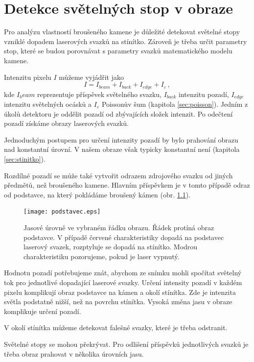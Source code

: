 \chapter{Detekce světelných stop v obraze}
\label{sec:detection}
Pro analýzu vlastností broušeného kamene je důležité detekovat světelné stopy vzniklé dopadem laserových svazků na stínítko. Zároveň je třeba určit parametry stop, které se budou porovnávat s parametry svazků matematického modelu kamene. 

Intenzitu pixelu $I$ můžeme vyjádřit jako 
\begin{equation}
	I = I_{beam}+I_{back}+I_{edge}+I_{\varepsilon}\,,
	\label{eq:intensitu_sum}
\end{equation}
 kde $I_beam$ reprezentuje příspěvek světelného svazku, $I_{back}$ intenzitu pozadí, $I_{edge}$ intenzitu světelných ocásků a $I_{\varepsilon}$ Poissonův šum (kapitola \ref{sec:poisson}). Jedním z úkolů detektoru je oddělit pozadí od zbývajících složek intenzit. Po odečtení pozadí získáme obrazy laserových svazků.   
 
Jednoduchým postupem pro určení intenzity pozadí by bylo prahování obrazu nad konstantní úrovní. V našem obraze však typicky konstantní není (kapitola \ref{sec:stinitko}). 

Rozdílné pozadí se může také vytvořit odrazem zdrojového svazku od jiných předmětů, než broušeného kamene. Hlavním příspěvkem je v tomto případě odraz od podstavce, na který pokládáme broušený kámen (obr. \ref{fig: podstavec}).

\begin{figure}[htps]
\centering
\texttt{[image: podstavec.eps]}
\caption{Jasové úrovně ve vybraném řádku obrazu. Řádek protíná obraz podstavce. V případě červené charakteristiky dopadá na podstavec laserový svazek, rozptyluje se dopadá na stínítko. Modrou charakteristiku pozorujeme, pokud je laser vypnutý.}
\label{fig: podstavec}
\end{figure}

Hodnotu pozadí potřebujeme znát, abychom ze snímku mohli spočítat světelný tok pro jednotlivé dopadající laserové svazky. Určení intensity pozadí v každém pixelu komplikují obraz podstavce na kámen a okolí stínítka. Zde je intenzita světla podstatně nižší, než na povrchu stínítka. Vysoká změna jasu v obraze komplikuje určení pozadí.  

V okolí stínítka můžeme detekovat falešné svazky, které je třeba odstranit. 

Světelné stopy se mohou překrývat. Pro odlišení příspěvků jednotlivých svazků je třeba obraz prahovat v několika úrovních jasu.

